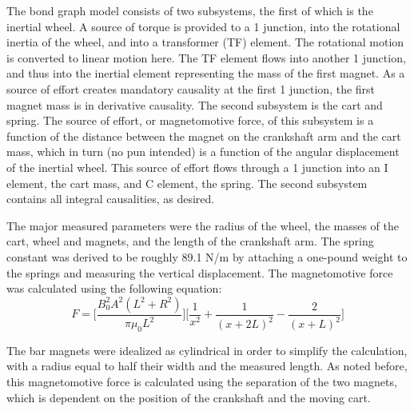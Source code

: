 \documentclass[notitlepage,10pt]{report}
\begin{document}
\begin{multicols}{2}
The bond graph model consists of two subsystems, the first of which is the inertial wheel. A source of torque is provided to a 1 junction, into the rotational inertia of the wheel, and into a transformer (TF) element. The rotational motion is converted to linear motion here. The TF element flows into another 1 junction, and thus into the inertial element representing the mass of the first magnet. As a source of effort creates mandatory causality at the first 1 junction, the first magnet mass is in derivative causality. The second subsystem is the cart and spring. The source of effort, or magnetomotive force, of this subsystem is a function of the distance between the magnet on the crankshaft arm and the cart mass, which in turn (no pun intended) is a function of the angular displacement of the inertial wheel. This source of effort flows through a 1 junction into an I element, the cart mass, and C element, the spring. The second subsystem contains all integral causalities, as desired. 

The major measured parameters were the radius of the wheel, the masses of the cart, wheel and magnets, and the length of the crankshaft arm. The spring constant was derived to be roughly 89.1 N/m by attaching a one-pound weight to the springs and measuring the vertical displacement. The magnetomotive force was calculated using the following equation: 
\begin{equation}
   F=\bigg[\frac{B_0^2A^2(L^2+R^2)}{\pi\mu_0L^2}\bigg]\bigg[\frac{1}{x^2} + \frac{1}{(x+2L)^2} - \frac{2}{(x+L)^2}\bigg]
\end{equation}

The bar magnets were idealized as cylindrical in order to simplify the calculation, with a radius equal to half their width and the measured length. As noted before, this magnetomotive force is calculated using the separation of the two magnets, which is dependent on the position of the crankshaft and the moving cart. 


\end{multicols}
\end{document}
